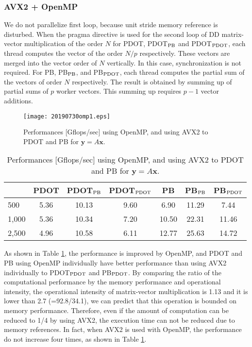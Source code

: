 \documentclass{IOS-Book-Article}
\begin{document}

\subsubsection{AVX2 + OpenMP}
We do not parallelize first loop, because unit stride memory reference is disturbed. When the pragma directive is used for the second loop of DD matrix-vector multiplication of the order $N$ for PDOT, PDOT$_{\rm{PB}}$ and PDOT$_{\rm{PDOT}}$, each thread computes the vector of the order $N/p$ respectively. These vectors are merged into the vector order of $N$ vertically. In this case, synchronization is not required. For PB, PB$_{\rm{PB}}$, and PB$_{\rm{PDOT}}$, each thread computes the partial sum of the vectors of order $N$ respectively. The result is obtained by summing up of partial sums of $p$ worker vectors. This summing up requires $p-1$ vector additions.

\begin{figure}[htbp]
  \begin{center}
    \texttt{[image: 20190730omp1.eps]}
        \caption{Performances [Gflops/sec] using OpenMP, and using AVX2 to PDOT and PB for $\bm{y} = A\bm{x}$.}
    \label{figMM}
  \end{center}
\end{figure}

\begin{table}[htbp]
\centering
\footnotesize
\caption{Performances [Gflops/sec] using OpenMP, and using AVX2 to PDOT and PB for $\bm{y} = A\bm{x}$.}
\label{MVomp}
\begin{tabular}{l||c|cc||c|cc}
\hline
                       & PDOT    & PDOT$_{\rm{PB}}$       & PDOT$_{\rm{PDOT}}$      & PB   & PB$_{\rm{PB}}$        & PB$_{\rm{PDOT}}$       \\ \hline
\multirow{1}{*}{500}   & 5.36 & 10.13 & 9.60 & 6.90 & 11.29   & 7.44  \\  
\multirow{1}{*}{1,000} & 5.36 & 10.34 & 7.20 & 10.50 & 22.31 & 11.46  \\
\multirow{1}{*}{2,500} & 4.96 & 10.58 & 6.11 & 12.77 & 25.63  & 14.72 \\ \hline
\end{tabular}
\end{table}

As shown in Table \ref{MVomp}, the performance is improved by OpenMP, and PDOT and PB using OpenMP individually have better performance than using AVX2 individually to PDOT$_{\rm{PDOT}}$ and PB$_{\rm{PDOT}}$. 
By comparing the ratio of the computational performance by the memory performance and operational intensity, the operational intensity of matrix-vector multiplication is 1.13 and it is lower than 2.7 (=92.8/34.1), we can predict that this operation is bounded on memory performance.
Therefore, even if the amount of computation can be reduced to 1/4 by using AVX2, the execution time can not be reduced due to memory references. 
In fact, when AVX2 is used with OpenMP, the performance do not increase four times, as shown in Table \ref{MVomp}.
\end{document}
